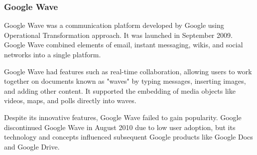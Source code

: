 \documentclass[a4paper, 11pt, oneside]{article}
\theoremstyle{definition}
\begin{document}
\subsubsection{Google Wave}

Google Wave \cite{wavewiki,waveyt} was a communication platform developed by Google using Operational Transformation approach. It was launched in September 2009. Google Wave combined elements of email, instant messaging, wikis, and social networks into a single platform.

Google Wave had features such as real-time collaboration, allowing users to work together on documents known as "waves" by typing messages, inserting images, and adding other content. It supported the embedding of media objects like videos, maps, and polls directly into waves.

Despite its innovative features, Google Wave failed to gain popularity. Google discontinued Google Wave in August 2010 due to low user adoption, but its technology and concepts influenced subsequent Google products like Google Docs and Google Drive.
\end{document}

